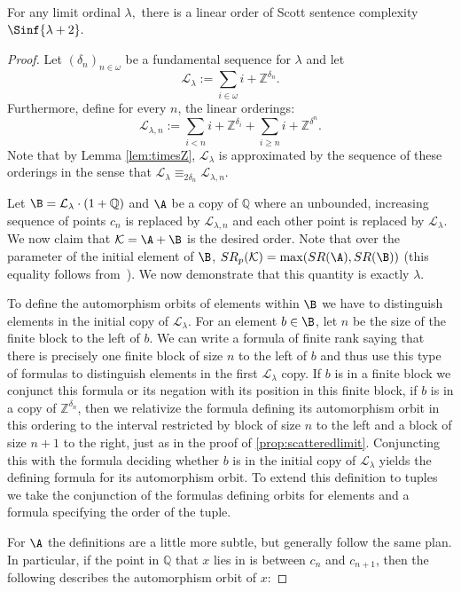 \documentclass{amsart}
\newcommand{\SR}{SR}
\newcommand{\Q}{\mathbb{Q}}
\newcommand{\Z}{\mathbb{Z}}
\newcommand{\K}{\mathcal{K}}
\renewcommand{\L}{\mathcal{L}}
\begin{document}
\begin{theorem}\label{thm:Slim+2}
For any limit ordinal $\lambda,$ there is a linear order of Scott sentence
complexity $\Sinf{\lambda+2}.$
\end{theorem}
\begin{proof}
    Let $(\delta_n)_{n\in\omega}$ be a
    fundamental sequence for $\lambda$ and let 
\[\L_\lambda:=\sum_{i\in\omega}i+\Z^{\delta_n}.\]
Furthermore, define for every $n$, the linear orderings:
\[\L_{\lambda,n}:=\sum_{i< n} i+\Z^{\delta_i}+\sum_{i\geq n} i+\Z^{\delta^n}.\]
Note that by Lemma \ref{lem:timesZ}, $\L_\lambda$ is approximated by the
sequence of these orderings in the sense that $\L_\lambda\equiv_{2\delta_n}\L_{\lambda,n}.$

Let $\B=\L_\lambda\cdot(1+\Q)$ and $\A$ be a copy of $\Q$ where an unbounded,
increasing sequence of points $c_n$ is replaced by $\L_{\lambda,n}$ and each
other point is replaced by $\L_\lambda$. We now claim that $\K=\A+\B$ is the
desired order. Note that over the parameter of the initial element of $\B$,
$\SR_p(\K)=\max(\SR(\A),\SR(\B))$ (this equality follows from~\cite[Lemma
11]{GM23}). We now demonstrate that this quantity is exactly $\lambda$.

To define the automorphism orbits of elements within $\B$ we have to distinguish
elements in the initial copy of $\L_\lambda$. For an element $b\in \B$, let $n$
be the size of the finite block to the left of $b$. We can write a formula of
finite rank saying that there is precisely one finite block of size $n$
to the left of $b$ and thus use this type of formulas to distinguish elements in
the first $\L_\lambda$ copy. If $b$ is in a finite block we conjunct this
formula or its negation with its position in this finite block, if $b$ is in a
copy of $\Z^{\delta_n}$, then we relativize the formula defining its
automorphism orbit in this ordering to the interval restricted by block of size
$n$ to the left and a block of size $n+1$ to the right, just as in the proof of
\cref{prop:scatteredlimit}. Conjuncting this with the formula deciding whether
$b$ is in the initial copy of $\L_\lambda$ yields the defining formula for its
automorphism orbit. To extend this definition to tuples we take the conjunction
of the formulas defining orbits for elements and a formula specifying the order
of the tuple.

For $\A$ the definitions are a little more subtle, but generally follow the same
plan. In particular, if the point in $\Q$ that $x$ lies in is between $c_n$ and
$c_{n+1}$, then the following describes the automorphism orbit of $x$:


\end{proof}
\end{document}
